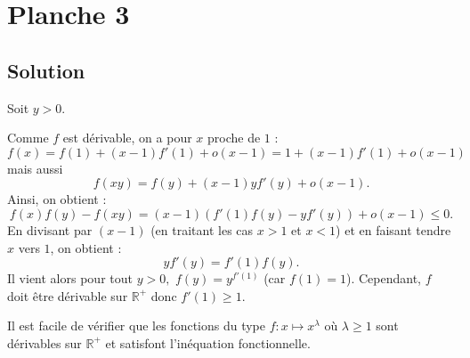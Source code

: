 \chapter{Planche 3}

\section{Solution}

Soit $y>0.$

Comme $f$ est dérivable, on a pour $x$ proche de $1$ : 
$$f(x)=f(1)+(x-1)f'(1)+o(x-1)=1+(x-1)f'(1)+o(x-1)$$ mais aussi $$ f(xy)=f(y)+(x-1)yf'(y)+o(x-1).$$
Ainsi, on obtient : $$f(x)f(y)-f(xy)=(x-1)\left( f'(1)f(y)-yf'(y) \right)+o(x-1)\leq 0.$$
En divisant par $(x-1)$ (en traitant les cas $x>1$ et $x<1$) et en faisant tendre $x$ vers $1$, on obtient : $$yf'(y)=f'(1)f(y).$$
Il vient alors pour tout $y>0,$ $\displaystyle f(y)=y^{f'(1)}$ (car $f(1)=1$).
Cependant, $f$ doit être dérivable sur $\mathbb{R}^{+}$ donc $f'(1)\geq 1.$

Il est facile de vérifier que les fonctions du type $ f: x\mapsto x^{\lambda}$ où $\lambda\geq 1$ sont dérivables sur $\mathbb{R}^{+}$ et satisfont l'inéquation fonctionnelle.